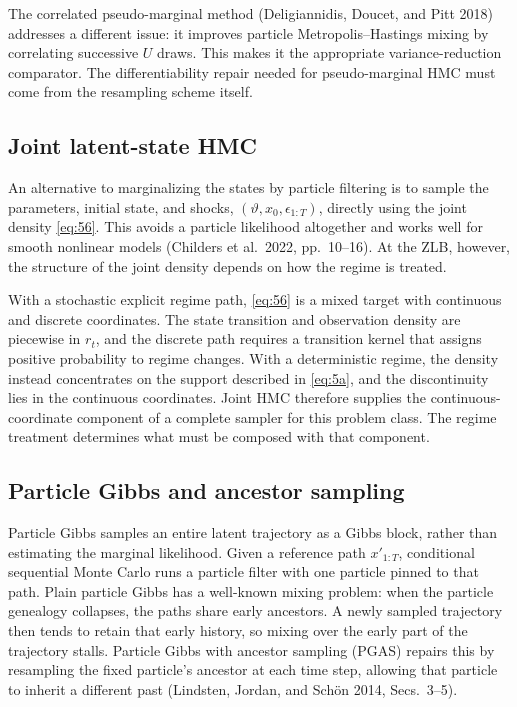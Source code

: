\documentclass[11pt]{article}
\begin{document}
The correlated pseudo-marginal method (Deligiannidis, Doucet, and Pitt
2018) addresses a different issue: it improves particle Metropolis--Hastings mixing by correlating successive $U$ draws. This makes it the appropriate variance-reduction comparator. The differentiability repair needed for pseudo-marginal HMC must come from the resampling scheme itself.

\subsection{Joint latent-state HMC}\label{sec:joint-hmc}

An alternative to marginalizing the states by particle filtering is to sample the parameters, initial state, and shocks, $(\vartheta,x_0,\epsilon_{1:T})$, directly using the joint density \eqref{eq:56}. This avoids a particle likelihood altogether and works well for smooth nonlinear models (Childers et al.\ 2022, pp.~10--16). At the ZLB, however, the structure of the joint density depends on how the regime is treated.

With a stochastic explicit regime path, \eqref{eq:56} is a mixed target with continuous and discrete coordinates. The state transition and observation density are piecewise in $r_t$, and the discrete path requires a transition kernel that assigns positive probability to regime changes. With a deterministic regime, the density instead concentrates on the support described in \eqref{eq:5a}, and the discontinuity lies in the continuous coordinates. Joint HMC therefore supplies the continuous-coordinate component of a complete sampler for this problem class. The regime treatment determines what must be composed with that component.

\subsection{Particle Gibbs and ancestor sampling}\label{sec:pgas}

Particle Gibbs samples an entire latent trajectory as a Gibbs block, rather than estimating the marginal likelihood. Given a reference path $x'_{1:T}$, conditional sequential Monte Carlo runs a particle filter with one particle pinned to that path. Plain particle Gibbs has a well-known mixing problem: when the particle genealogy collapses, the paths share early ancestors. A newly sampled trajectory then tends to retain that early history, so mixing over the early part of the trajectory stalls. Particle Gibbs with ancestor sampling (PGAS) repairs this by resampling the fixed particle's ancestor at each time step, allowing that particle to inherit a different past (Lindsten, Jordan,
and Sch\"on 2014, Secs.~3--5).
\end{document}
